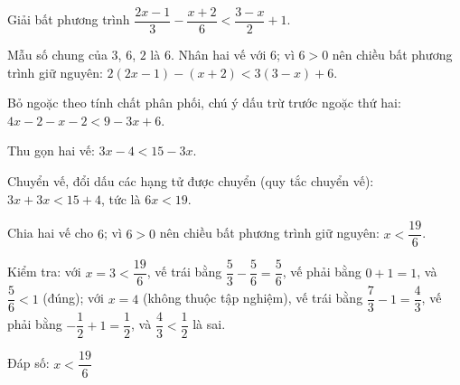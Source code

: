 \begin{problem}[9DS-BPT-040]
Giải bất phương trình $\dfrac{2x - 1}{3} - \dfrac{x + 2}{6} < \dfrac{3 - x}{2} + 1$.

\begin{solution}
Mẫu số chung của $3$, $6$, $2$ là $6$. Nhân hai vế với $6$; vì $6 > 0$ nên chiều bất phương trình giữ nguyên: $2(2x - 1) - (x + 2) < 3(3 - x) + 6$.

Bỏ ngoặc theo tính chất phân phối, chú ý dấu trừ trước ngoặc thứ hai: $4x - 2 - x - 2 < 9 - 3x + 6$.

Thu gọn hai vế: $3x - 4 < 15 - 3x$.

Chuyển vế, đổi dấu các hạng tử được chuyển (quy tắc chuyển vế): $3x + 3x < 15 + 4$, tức là $6x < 19$.

Chia hai vế cho $6$; vì $6 > 0$ nên chiều bất phương trình giữ nguyên: $x < \dfrac{19}{6}$.

Kiểm tra: với $x = 3 < \dfrac{19}{6}$, vế trái bằng $\dfrac{5}{3} - \dfrac{5}{6} = \dfrac{5}{6}$, vế phải bằng $0 + 1 = 1$, và $\dfrac{5}{6} < 1$ (đúng); với $x = 4$ (không thuộc tập nghiệm), vế trái bằng $\dfrac{7}{3} - 1 = \dfrac{4}{3}$, vế phải bằng $-\dfrac{1}{2} + 1 = \dfrac{1}{2}$, và $\dfrac{4}{3} < \dfrac{1}{2}$ là sai.

Đáp số: $\boxed{x < \dfrac{19}{6}}$
\end{solution}
\end{problem}

